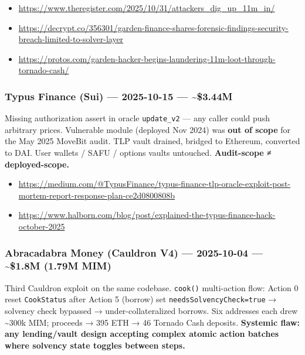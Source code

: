 \begin{itemize}
\tightlist
\item
  \url{https://www.theregister.com/2025/10/31/attackers_dig_up_11m_in/}
\item
  \url{https://decrypt.co/356301/garden-finance-shares-forensic-findings-security-breach-limited-to-solver-layer}
\item
  \url{https://protos.com/garden-hacker-begins-laundering-11m-loot-through-tornado-cash/}
\end{itemize}

\subsubsection{Typus Finance (Sui) --- 2025-10-15 --- \textasciitilde\$3.44M}\label{typus-finance-sui-2025-10-15-3.44m}

Missing authorization assert in oracle \texttt{update\_v2} --- any caller could push arbitrary prices. Vulnerable module (deployed Nov 2024) was \textbf{out of scope} for the May 2025 MoveBit audit. TLP vault drained, bridged to Ethereum, converted to DAI. User wallets / SAFU / options vaults untouched. \textbf{Audit-scope ≠ deployed-scope.}

\begin{itemize}
\tightlist
\item
  \url{https://medium.com/@TypusFinance/typus-finance-tlp-oracle-exploit-post-mortem-report-response-plan-ce2d0800808b}
\item
  \url{https://www.halborn.com/blog/post/explained-the-typus-finance-hack-october-2025}
\end{itemize}

\subsubsection{Abracadabra Money (Cauldron V4) --- 2025-10-04 --- \textasciitilde\$1.8M (1.79M MIM)}\label{abracadabra-money-cauldron-v4-2025-10-04-1.8m-1.79m-mim}

Third Cauldron exploit on the same codebase. \texttt{cook()} multi-action flow: Action 0 reset \texttt{CookStatus} after Action 5 (borrow) set \texttt{needsSolvencyCheck=true} → solvency check bypassed → under-collateralized borrows. Six addresses each drew \textasciitilde300k MIM; proceeds → 395 ETH → 46 Tornado Cash deposits. \textbf{Systemic flaw: any lending/vault design accepting complex atomic action batches where solvency state toggles between steps.}

